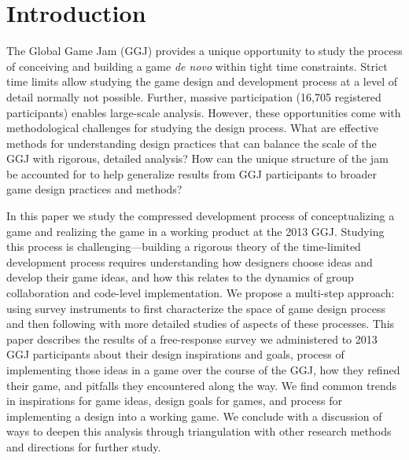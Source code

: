 \documentclass{sig-alternate}
\begin{document}
\section{Introduction}
The Global Game Jam (GGJ) provides a unique opportunity to study the process of conceiving and building a game \textit{de novo} within tight time constraints. Strict time limits allow studying the game design and development process at a level of detail normally not possible. Further, massive participation (16,705 registered participants) enables large-scale analysis.
However, these opportunities come with methodological challenges for studying the design process. What are effective methods for understanding design practices that can balance the scale of the GGJ with rigorous, detailed analysis? How can the unique structure of the jam be accounted for to help generalize results from GGJ participants to broader game design practices and methods?


In this paper we study the compressed development process of conceptualizing a game and realizing the game in a working product at the 2013 GGJ. Studying this process is challenging---building a rigorous theory of the time-limited development process requires understanding how designers choose ideas and develop their game ideas, and how this relates to the dynamics of group collaboration and code-level implementation. 
We propose a multi-step approach: 
using survey instruments to first characterize the space of game design process
and then following with more detailed studies of aspects of these processes.
This paper describes the results of a free-response survey we administered to 2013 GGJ participants about their design inspirations and goals, process of implementing those ideas in a game over the course of the GGJ, how they refined their game, and pitfalls they encountered along the way. 
We find common trends in inspirations for game ideas, design goals for games, and process for implementing a design into a working game.
We conclude with a discussion of ways to deepen this analysis through triangulation with other research methods and directions for further study.


\end{document}
